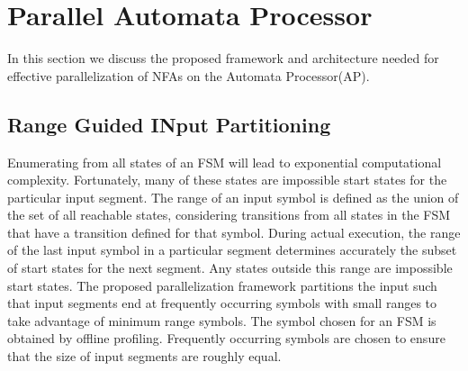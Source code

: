 \section{\textbf{Parallel Automata Processor}}
In this section we discuss the proposed framework and architecture \cite{} needed for effective parallelization of NFAs on the Automata Processor(AP).

\subsection{Range Guided INput Partitioning}
Enumerating from all states of an FSM will lead to exponential
computational complexity. Fortunately, many of these states are impossible start states for the particular input segment. The range of
an input symbol is defined as the union of the set of all reachable
states, considering transitions from all states in the FSM that have
a transition defined for that symbol. During actual execution, the
range of the last input symbol in a particular segment determines
accurately the subset of start states for the next segment. Any states
outside this range are impossible start states. The proposed parallelization framework \cite{} partitions the input such that input segments
end at frequently occurring symbols with small ranges to take advantage of minimum range symbols. The symbol chosen for an FSM
is obtained by offline profiling. Frequently occurring symbols are
chosen to ensure that the size of input segments are roughly equal.

